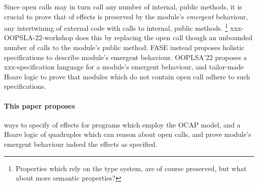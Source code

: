 Since open calls may in turn call any number of internal, public methods, 
it is crucial  to prove that \taming of effects is preserved by the module's 
\emph{emergent} behaviour, \ie any intertwining of external code with calls to internal, public methods.
\footnote{Properties which rely on the type system, are of course preserved, but what about more semantic properties?}
xxx-OOPSLA-22-workshop does this by replacing the open call though an unbounded number of calls to the module's public method.
 FASE instead proposes holistic specifications to describe   module's emergent behaviour. 
 OOPLSA'22 proposes a xxx-specification language for a module's emergent behaviour, and  tailor-made Hoare logic to prove that modules which do not contain open call adhere to such specifications.




\paragraph{This paper proposes} %
 ways to specify  \taming of effects for  programs which employ the OCAP model, 
 and a Hoare logic of quadruples which can reason about open calls, and prove module's emergent behaviour indeed \tames the effects as specified.

